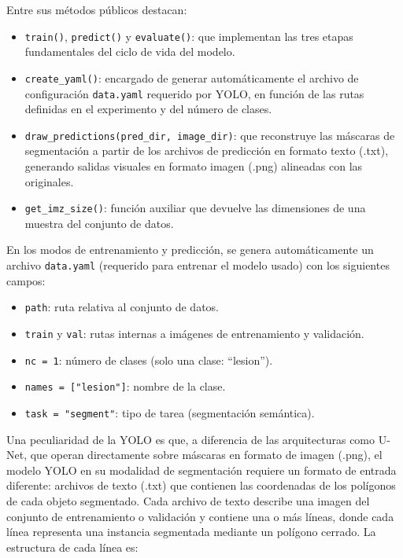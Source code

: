 \documentclass[../main.tex]{subfiles}
\begin{document}
    
Entre sus métodos públicos destacan:
\begin{itemize}
    \item \texttt{train()}, \texttt{predict()} y \texttt{evaluate()}: que implementan las tres etapas fundamentales del ciclo de vida del modelo.

    \item \texttt{create\_yaml()}: encargado de generar automáticamente el archivo de configuración \texttt{data.yaml} requerido por YOLO, en función de las rutas definidas en el experimento y del número de clases.

    \item \texttt{draw\_predictions(pred\_dir, image\_dir)}: que reconstruye las máscaras de segmentación a partir de los archivos de predicción en formato texto (.txt), generando salidas visuales en formato imagen (.png) alineadas con las originales.

    \item  \texttt{get\_imz\_size()}: función auxiliar que devuelve las dimensiones de una muestra del conjunto de datos.
\end{itemize}

En los modos de entrenamiento y predicción, se genera automáticamente un archivo \texttt{data.yaml} (requerido para entrenar el modelo usado) con los siguientes campos:
\begin{itemize}
    \item \texttt{path}: ruta relativa al conjunto de datos.
    \item \texttt{train} y \texttt{val}: rutas internas a imágenes de entrenamiento y validación.
    \item \texttt{nc = 1}: número de clases (solo una clase: “lesion”).
    \item \texttt{names = ["lesion"]}: nombre de la clase.
    \item \texttt{task = "segment"}: tipo de tarea (segmentación semántica).
\end{itemize}

Una peculiaridad de la YOLO es que, a diferencia de las arquitecturas como U-Net, que operan directamente sobre máscaras en formato de imagen (.png), el modelo YOLO en su modalidad de segmentación requiere un formato de entrada diferente: archivos de texto (.txt) que contienen las coordenadas de los polígonos de cada objeto segmentado. Cada archivo de texto describe una imagen del conjunto de entrenamiento o validación y contiene una o más líneas, donde cada línea representa una instancia segmentada mediante un polígono cerrado. La estructura de cada línea es:
\end{document}
